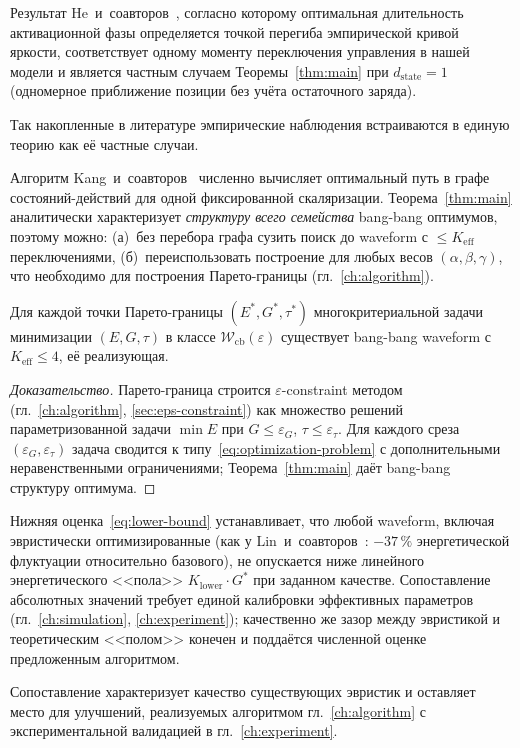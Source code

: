 \begin{corollary}
\label{cor:he2020-special-case}
Результат He~и~соавторов~\cite{he2020_particle_activation}, согласно
которому оптимальная длительность активационной фазы определяется точкой
перегиба эмпирической кривой яркости, соответствует одному моменту
переключения управления в нашей модели и является частным случаем
Теоремы~\ref{thm:main} при $d_{\mathrm{state}} = 1$ (одномерное
приближение позиции без учёта остаточного заряда).
\end{corollary}

Так накопленные в литературе эмпирические наблюдения встраиваются в единую
теорию как её частные случаи.

\begin{corollary}
\label{cor:vs-kang}
Алгоритм Kang~и~соавторов~\cite{kang2025_dp_waveform} численно вычисляет
оптимальный путь в графе состояний-действий для одной фиксированной
скаляризации. Теорема~\ref{thm:main} аналитически характеризует
\emph{структуру всего семейства} bang-bang оптимумов, поэтому можно:
(а)~без перебора графа сузить поиск до waveform с $\le K_{\mathrm{eff}}$
переключениями, (б)~переиспользовать построение для любых весов
$(\alpha, \beta, \gamma)$, что необходимо для построения Парето-границы
(гл.~\ref{ch:algorithm}).
\end{corollary}

\begin{corollary}
\label{cor:pareto-applicability}
Для каждой точки Парето-границы $(E^*, G^*, \tau^*)$ многокритериальной
задачи минимизации $(E, G, \tau)$ в классе
$\mathcal{W}_{\mathrm{cb}}(\varepsilon)$ существует bang-bang waveform с
$K_{\mathrm{eff}} \le 4$, её реализующая.
\end{corollary}

\begin{proof}[Доказательство]
Парето-граница строится $\varepsilon$-constraint методом
(гл.~\ref{ch:algorithm}, \ref{sec:eps-constraint}) как множество решений
параметризованной задачи $\min E$ при $G \le \varepsilon_G$,
$\tau \le \varepsilon_\tau$. Для каждого среза
$(\varepsilon_G, \varepsilon_\tau)$ задача сводится к
типу~\eqref{eq:optimization-problem} с дополнительными неравенственными
ограничениями; Теорема~\ref{thm:main} даёт bang-bang структуру
оптимума.\qedhere
\end{proof}

\begin{corollary}
\label{cor:lower-bound-vs-lin}
Нижняя оценка~\eqref{eq:lower-bound} устанавливает, что любой waveform,
включая эвристически оптимизированные (как у
Lin~и~соавторов~\cite{lin2024_low_power}: $-37\,\%$ энергетической флуктуации
относительно базового), не опускается ниже линейного
энергетического <<пола>> $K_{\mathrm{lower}}\cdot G^*$ при заданном качестве.
Сопоставление абсолютных значений требует единой калибровки эффективных
параметров (гл.~\ref{ch:simulation}, \ref{ch:experiment}); качественно же
зазор между эвристикой и теоретическим <<полом>>
конечен и поддаётся численной оценке предложенным алгоритмом.
\end{corollary}

Сопоставление характеризует качество существующих эвристик и
оставляет место для улучшений, реализуемых алгоритмом гл.~\ref{ch:algorithm}
с экспериментальной валидацией в гл.~\ref{ch:experiment}.
